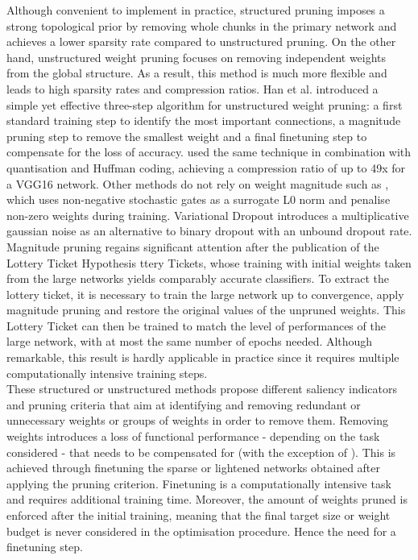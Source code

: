 Although convenient to implement in practice, structured pruning imposes a
strong topological prior by removing whole chunks in the primary network and
achieves a lower sparsity rate compared to unstructured pruning. On the other
hand, unstructured weight pruning focuses on removing independent weights from
the global structure. As a result, this method is much more flexible and leads
to high sparsity rates and compression ratios. Han et al.
\cite{DBLP:conf/nips/HanPTD15} introduced a simple yet effective three-step
algorithm for unstructured weight pruning: a first standard training step to
identify the most important connections, a magnitude pruning step to remove the
smallest weight and a final finetuning step to compensate for the loss of
accuracy. \cite{DBLP:journals/corr/HanMD15} used the same technique in
combination with quantisation and Huffman coding, achieving a compression ratio
of up to 49x for a VGG16 network. Other methods do not rely on weight magnitude
such as \cite{DBLP:conf/iclr/LouizosWK18}, which uses non-negative stochastic
gates as a surrogate L0 norm and penalise non-zero weights during training.
Variational Dropout \cite{DBLP:conf/icml/MolchanovAV17} introduces a
multiplicative gaussian noise as an alternative to binary dropout
\cite{DBLP:journals/corr/abs-1207-0580,DBLP:journals/jmlr/SrivastavaHKSS14} with
an unbound dropout rate. Magnitude pruning regains significant attention after
the publication of the Lottery Ticket Hypothesis
\cite{DBLP:conf/iclr/FrankleC19}ttery Tickets, whose training with initial
weights taken from the large networks yields comparably accurate classifiers. To
extract the lottery ticket, it is necessary to train the large network up to
convergence, apply magnitude pruning and restore the original values of the
unpruned weights. This Lottery Ticket can then be trained to match the level of
performances of the large network, with at most the same number of epochs
needed. Although remarkable, this result is hardly applicable in practice since
it requires multiple computationally intensive training steps.\\


These structured or unstructured methods propose different saliency indicators
and pruning criteria that aim at identifying and removing redundant or
unnecessary weights or groups of weights in order to remove them. Removing
weights introduces a loss of functional performance - depending on the task
considered - that needs to be compensated for (with the exception of
\cite{DBLP:conf/icml/KangH20}). This is achieved through finetuning the sparse
or lightened networks obtained after applying the pruning criterion. Finetuning
is a computationally intensive task and requires additional training time.
Moreover, the amount of weights pruned is enforced after the initial training,
meaning that the final target size or weight budget is never considered in the
optimisation procedure. Hence the need for a finetuning step. \\


